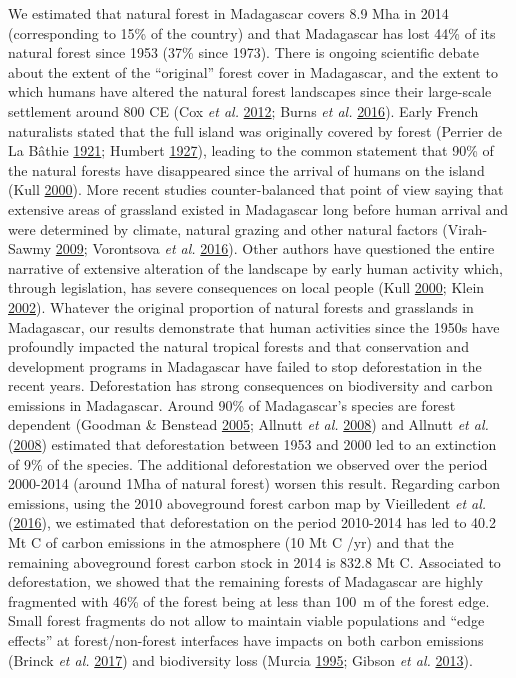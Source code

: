 \documentclass[]{article}
\theoremstyle{definition}
\theoremstyle{definition}
\theoremstyle{definition}
\theoremstyle{remark}
\begin{document}
We estimated that natural forest in Madagascar covers 8.9 Mha in 2014
(corresponding to 15\% of the country) and that Madagascar has lost 44\%
of its natural forest since 1953 (37\% since 1973). There is ongoing
scientific debate about the extent of the ``original'' forest cover in
Madagascar, and the extent to which humans have altered the natural
forest landscapes since their large-scale settlement around 800 CE (Cox
\emph{et al.} \protect\hyperlink{ref-Cox2012}{2012}; Burns \emph{et al.}
\protect\hyperlink{ref-Burns2016}{2016}). Early French naturalists
stated that the full island was originally covered by forest (Perrier de
La Bâthie \protect\hyperlink{ref-Perrier1921}{1921}; Humbert
\protect\hyperlink{ref-Humbert1927}{1927}), leading to the common
statement that 90\% of the natural forests have disappeared since the
arrival of humans on the island (Kull
\protect\hyperlink{ref-Kull2000}{2000}). More recent studies
counter-balanced that point of view saying that extensive areas of
grassland existed in Madagascar long before human arrival and were
determined by climate, natural grazing and other natural factors
(Virah-Sawmy \protect\hyperlink{ref-Virah-Sawmy2009}{2009}; Vorontsova
\emph{et al.} \protect\hyperlink{ref-Vorontsova2017}{2016}). Other
authors have questioned the entire narrative of extensive alteration of
the landscape by early human activity which, through legislation, has
severe consequences on local people (Kull
\protect\hyperlink{ref-Kull2000}{2000}; Klein
\protect\hyperlink{ref-Klein2002}{2002}). Whatever the original
proportion of natural forests and grasslands in Madagascar, our results
demonstrate that human activities since the 1950s have profoundly
impacted the natural tropical forests and that conservation and
development programs in Madagascar have failed to stop deforestation in
the recent years. Deforestation has strong consequences on biodiversity
and carbon emissions in Madagascar. Around 90\% of Madagascar's species
are forest dependent (Goodman \& Benstead
\protect\hyperlink{ref-Goodman2005}{2005}; Allnutt \emph{et al.}
\protect\hyperlink{ref-Allnutt2008}{2008}) and Allnutt \emph{et al.}
(\protect\hyperlink{ref-Allnutt2008}{2008}) estimated that deforestation
between 1953 and 2000 led to an extinction of 9\% of the species. The
additional deforestation we observed over the period 2000-2014 (around
1Mha of natural forest) worsen this result. Regarding carbon emissions,
using the 2010 aboveground forest carbon map by Vieilledent \emph{et
al.} (\protect\hyperlink{ref-Vieilledent2016}{2016}), we estimated that
deforestation on the period 2010-2014 has led to 40.2 Mt C of carbon
emissions in the atmosphere (10 Mt C /yr) and that the remaining
aboveground forest carbon stock in 2014 is 832.8 Mt C. Associated to
deforestation, we showed that the remaining forests of Madagascar are
highly fragmented with 46\% of the forest being at less than 100~m of
the forest edge. Small forest fragments do not allow to maintain viable
populations and ``edge effects'' at forest/non-forest interfaces have
impacts on both carbon emissions (Brinck \emph{et al.}
\protect\hyperlink{ref-Brinck2017}{2017}) and biodiversity loss (Murcia
\protect\hyperlink{ref-Murcia1995}{1995}; Gibson \emph{et al.}
\protect\hyperlink{ref-Gibson2013}{2013}).
\end{document}
